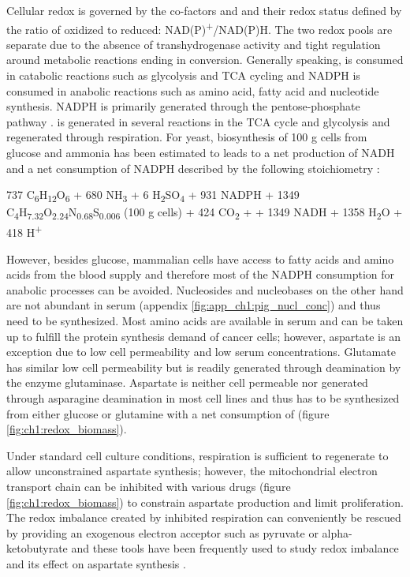 Cellular redox is governed by the co-factors \NADP{} and \NAD{} and their redox status defined by the ratio of oxidized to reduced: NAD(P)\textsuperscript{+}/NAD(P)H.
The two redox pools are separate due to the absence of transhydrogenase activity and tight regulation around metabolic reactions ending in conversion.
Generally speaking, \NAD{} is consumed in catabolic reactions such as glycolysis and TCA cycling and NADPH is consumed in anabolic reactions such as amino acid, fatty acid and nucleotide synthesis.
NADPH is primarily generated through the pentose-phosphate pathway \cite{Chen2019-ex, Ghergurovich2020-sh, Zhang2021-mg}.
\NAD{} is generated in several reactions in the TCA cycle and glycolysis and regenerated through respiration.
For yeast, biosynthesis of 100 g cells from glucose and ammonia has been estimated to leads to a net production of NADH and a net consumption of NADPH described by the following stoichiometry \cite{Bruinenberg1983-tn, Van_Dijken1986-zp}:
\begin{center}
737 C\textsubscript{6}H\textsubscript{12}O\textsubscript{6} + 680 NH\textsubscript{3} + 6 H\textsubscript{2}SO\textsubscript{4} + 931 NADPH + 1349 \NAD{} \Rightarrow {} C\textsubscript{4}H\textsubscript{7.32}O\textsubscript{2.24}N\textsubscript{0.68}S\textsubscript{0.006} (100 g cells) + 424 CO\textsubscript{2} +  \NADP{} + 1349 NADH + 1358 H\textsubscript{2}O + 418 H\textsuperscript{+}
\end{center}

However, besides glucose, mammalian cells have access to fatty acids and amino acids from the blood supply and therefore most of the NADPH consumption for anabolic processes can be avoided.
Nucleosides and nucleobases on the other hand are not abundant in serum \cite{Traut1994-vu} (appendix \ref{fig:app_ch1:pig_nucl_conc}) and thus need to be synthesized.
Most amino acids are available in serum and can be taken up to fulfill the protein synthesis demand of cancer cells; however, aspartate is an exception due to low cell permeability and low serum concentrations.
Glutamate has similar low cell permeability but is readily generated through deamination by the enzyme glutaminase.
Aspartate is neither cell permeable nor generated through asparagine deamination in most cell lines \cite{Sullivan2018-gz} and thus has to be synthesized from either glucose or glutamine with a net consumption of \NAD{} (figure \ref{fig:ch1:redox_biomass}).

Under standard cell culture conditions, respiration is sufficient to regenerate \NAD{} to allow unconstrained aspartate synthesis; however, the mitochondrial electron transport chain can be inhibited with various drugs (figure \ref{fig:ch1:redox_biomass}) to constrain aspartate production and limit proliferation.
The redox imbalance created by inhibited respiration can conveniently be rescued by providing an exogenous electron acceptor such as pyruvate or alpha-ketobutyrate and these tools have been frequently used to study redox imbalance and its effect on aspartate synthesis \cite{Birsoy2014-em, Sullivan2015-xf, Birsoy2015-pg, Gui2016-ca, Garcia-Bermudez2018-mj, Alkan2018-zv, Diehl2019-um, Yang2020-fs, Luengo2021-kb, Garcia-Bermudez2022-qn}.

